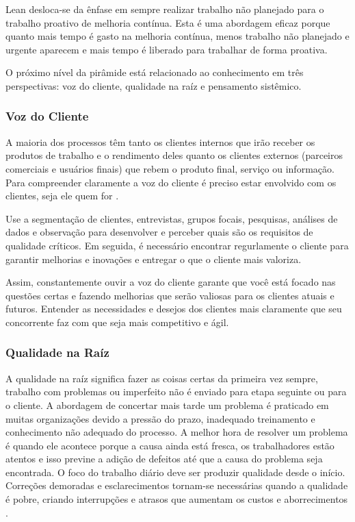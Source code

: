 Lean desloca-se da ênfase em sempre realizar trabalho não planejado para o trabalho proativo de melhoria contínua. Esta é uma abordagem eficaz porque quanto mais tempo é gasto na melhoria contínua, menos trabalho não planejado e urgente aparecem e mais tempo é liberado para trabalhar de forma proativa.

O próximo nível da pirâmide está relacionado ao conhecimento em três perspectivas: voz do cliente, qualidade na raíz e pensamento sistêmico.

\subsubsection[Voz do Cliente]{Voz do Cliente}

A maioria dos processos têm tanto os clientes internos que irão receber os produtos de trabalho e o rendimento deles quanto os clientes externos (parceiros comerciais e usuários finais) que rebem o produto final, serviço ou informação. Para compreender claramente a voz do cliente é preciso estar envolvido com os clientes, seja ele quem for \cite{bell2011}.

Use a segmentação de clientes, entrevistas, grupos focais, pesquisas, análises de dados e observação para desenvolver e perceber quais são os requisitos de qualidade críticos. Em seguida, é necessário encontrar regurlamente o cliente para garantir melhorias e inovações e entregar o que o cliente mais valoriza.

Assim, constantemente ouvir a voz do cliente garante que você está focado nas questões certas e fazendo melhorias que serão valiosas para os clientes atuais e futuros. Entender as necessidades e desejos dos clientes mais claramente que seu concorrente faz com que seja mais competitivo e ágil.

\subsubsection[Qualidade na Raíz]{Qualidade na Raíz}

A qualidade na raíz significa fazer as coisas certas da primeira vez sempre, trabalho com problemas ou imperfeito não é enviado para etapa seguinte ou para o cliente. A abordagem de concertar mais tarde um problema é praticado em muitas organizações devido a pressão do prazo, inadequado treinamento e conhecimento não adequado do processo.  A melhor hora de resolver um problema é quando ele acontece porque a causa ainda está fresca, os trabalhadores estão atentos e isso previne a adição de defeitos até que a causa do problema seja encontrada.  O foco do trabalho diário deve ser produzir qualidade desde o início. Correções demoradas e esclarecimentos tornam-se necessárias quando a qualidade é pobre, criando interrupções e atrasos que aumentam os custos e aborrecimentos \cite{bell2011}.

